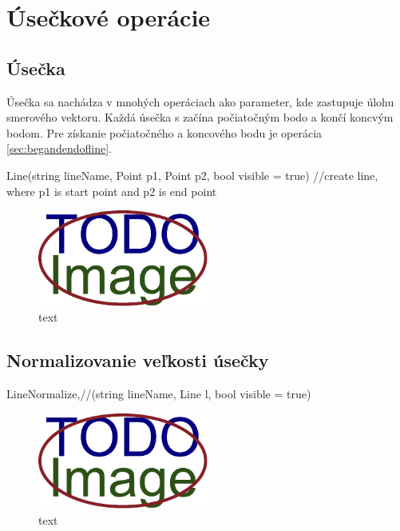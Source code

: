 	






\section{Úsečkové operácie}


\subsection{Úsečka}
Úsečka sa nachádza v mnohých operáciach ako parameter, kde zastupuje úlohu smerového vektoru. Každá úsečka s začína počiatočným bodo a končí koncvým bodom. Pre získanie počiatočného a koncového bodu je operácia \ref{sec:begandendofline}.

		Line(string lineName, Point p1, Point p2, bool visible = true) //create line, where p1 is start point and p2 is end point

\begin{figure}[H]
	\centering
	\includegraphics[width=0.5\textwidth]{obrazky-figures/placeholder.pdf}
	\caption{text}
	\label{fig:1}
\end{figure}

\subsection{Normalizovanie veľkosti úsečky}
		LineNormalize,//(string lineName, Line l, bool visible = true)

\begin{figure}[H]
	\centering
	\includegraphics[width=0.5\textwidth]{obrazky-figures/placeholder.pdf}
	\caption{text}
	\label{fig:1}
\end{figure}

